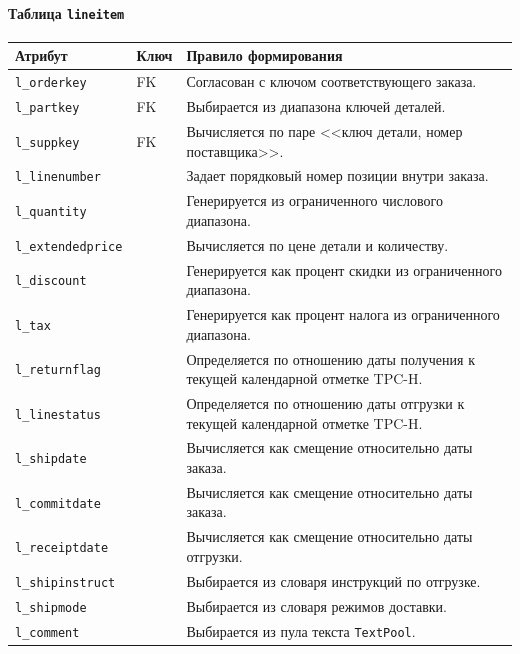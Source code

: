 \paragraph{Таблица \texttt{lineitem}}
\begin{center}
\small
\begin{tabular}{|p{}|p{}|p{}|}
\hline
\textbf{Атрибут} & \textbf{Ключ} & \textbf{Правило формирования} \\
\hline
\texttt{l\_orderkey} & FK & Согласован с ключом соответствующего заказа. \\
\hline
\texttt{l\_partkey} & FK & Выбирается из диапазона ключей деталей. \\
\hline
\texttt{l\_suppkey} & FK & Вычисляется по паре <<ключ детали, номер поставщика>>. \\
\hline
\texttt{l\_linenumber} &  & Задает порядковый номер позиции внутри заказа. \\
\hline
\texttt{l\_quantity} &  & Генерируется из ограниченного числового диапазона. \\
\hline
\texttt{l\_extendedprice} &  & Вычисляется по цене детали и количеству. \\
\hline
\texttt{l\_discount} &  & Генерируется как процент скидки из ограниченного диапазона. \\
\hline
\texttt{l\_tax} &  & Генерируется как процент налога из ограниченного диапазона. \\
\hline
\texttt{l\_returnflag} &  & Определяется по отношению даты получения к текущей календарной отметке TPC-H. \\
\hline
\texttt{l\_linestatus} &  & Определяется по отношению даты отгрузки к текущей календарной отметке TPC-H. \\
\hline
\texttt{l\_shipdate} &  & Вычисляется как смещение относительно даты заказа. \\
\hline
\texttt{l\_commitdate} &  & Вычисляется как смещение относительно даты заказа. \\
\hline
\texttt{l\_receiptdate} &  & Вычисляется как смещение относительно даты отгрузки. \\
\hline
\texttt{l\_shipinstruct} &  & Выбирается из словаря инструкций по отгрузке. \\
\hline
\texttt{l\_shipmode} &  & Выбирается из словаря режимов доставки. \\
\hline
\texttt{l\_comment} &  & Выбирается из пула текста \texttt{TextPool}. \\
\hline
\end{tabular}
\end{center}

